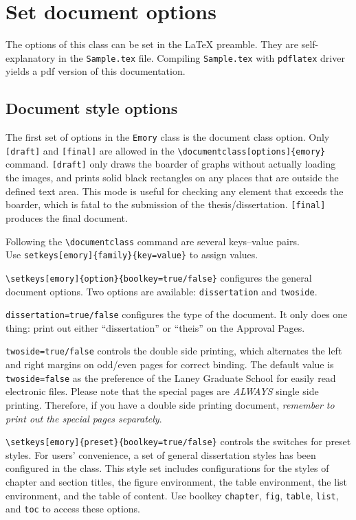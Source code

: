 \documentclass[draft]{emory}
\begin{document}
\section{Set document options}\label{sec:options}
The options of this class can be set in the \LaTeX{} preamble. They are 
self-explanatory in the \Verb|Sample.tex| file.
Compiling \Verb|Sample.tex| with \Verb|pdflatex| driver yields a pdf version of this documentation.

\subsection{Document style options}
The first set of options in the \Verb|Emory| class is the document class option.
Only \Verb|[draft]| and \Verb|[final]| are allowed in the 
\Verb|\documentclass[options]{emory}| command.
\Verb|[draft]| only draws the boarder of graphs without actually loading the images,
and prints solid black rectangles on any places that are outside the defined text area. 
This mode is useful for checking any element that exceeds the boarder,
which is fatal to the submission of the thesis/dissertation.
\Verb|[final]| produces the final document. 

Following the \Verb|\documentclass| command are several keys--value pairs.\\
Use \Verb|setkeys[emory]{family}{key=value}| to assign values.

\Verb|\setkeys[emory]{option}{boolkey=true/false}| configures the general document options.
Two options are available: \Verb|dissertation| and \Verb|twoside|.

\Verb|dissertation=true/false| configures the type of the document. 
It only does one thing: print out either ``dissertation'' or ``theis'' on the 
Approval Pages.

\Verb|twoside=true/false| controls the double side printing, which alternates the left and right margins on odd/even pages for correct binding.
The default value is \Verb|twoside=false| as the preference of the Laney Graduate School for easily read electronic files. 
Please note that the special pages are \emph{ALWAYS} single side printing. 
Therefore, if you have a double side printing document, \emph{remember to print out the special pages separately}.

\Verb|\setkeys[emory]{preset}{boolkey=true/false}| controls the switches for preset styles.
For users' convenience, a set of general dissertation styles has been configured in the class. 
This style set includes configurations for the styles of chapter and section 
titles, the figure environment, the table environment, the list environment, 
and the table of content. Use boolkey \Verb|chapter|, \Verb|fig|, \Verb|table|, 
\Verb|list|, and \Verb|toc| to access these options.
\end{document}
